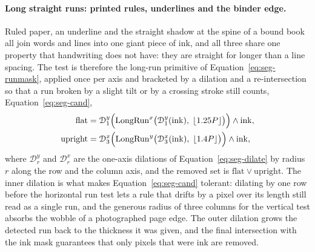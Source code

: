 \label{fig:seg-mask}

\paragraph{Long straight runs: printed rules, underlines and the binder edge.}
Ruled paper, an underline and the straight shadow at the spine of a bound book all join words and lines into one giant piece of ink, and all three share one property that handwriting does not have: they are straight for longer than a line spacing.
The test is therefore the long-run primitive of Equation~\ref{eq:seg-runmask}, applied once per axis and bracketed by a dilation and a re-intersection so that a run broken by a slight tilt or by a crossing stroke still counts, Equation~\ref{eq:seg-cand},
\begin{equation}
\begin{aligned}
\mathrm{flat}&=\mathcal D_{1}^{y}\Bigl(\mathrm{LongRun}^{x}\bigl(\mathcal D_{1}^{y}(\mathrm{ink}),\;\lfloor1.25P\rfloor\bigr)\Bigr)\wedge\mathrm{ink},\\
\mathrm{upright}&=\mathcal D_{3}^{x}\Bigl(\mathrm{LongRun}^{y}\bigl(\mathcal D_{3}^{x}(\mathrm{ink}),\;\lfloor1.4P\rfloor\bigr)\Bigr)\wedge\mathrm{ink},
\end{aligned}
\label{eq:seg-cand}
\end{equation}
where $\mathcal D_r^{y}$ and $\mathcal D_r^{x}$ are the one-axis dilations of Equation~\ref{eq:seg-dilate} by radius $r$ along the row and the column axis, and the removed set is $\mathrm{flat}\vee\mathrm{upright}$.
The inner dilation is what makes Equation~\ref{eq:seg-cand} tolerant: dilating by one row before the horizontal run test lets a rule that drifts by a pixel over its length still read as a single run, and the generous radius of three columns for the vertical test absorbs the wobble of a photographed page edge.
The outer dilation grows the detected run back to the thickness it was given, and the final intersection with the ink mask guarantees that only pixels that were ink are removed.
